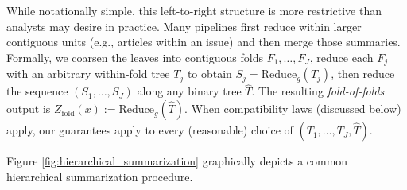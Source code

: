 \documentclass[11pt]{article}
\newcommand{\reduce}{\text{Reduce}}
\newcommand{\reduceg}{\reduce_g}
\begin{document}
While notationally simple, this left-to-right structure is more restrictive than analysts may desire in practice. Many pipelines first reduce within larger contiguous units (e.g., articles within an issue) and then merge those summaries. Formally, we coarsen the leaves into contiguous folds $F_1,\ldots,F_J$, reduce each $F_j$ with an arbitrary within-fold tree $T_j$ to obtain $S_j=\reduceg(T_j)$, then reduce the sequence $(S_1,\ldots,S_J)$ along any binary tree $\widehat T$. The resulting \emph{fold-of-folds} output is $Z_{\mathrm{fold}}(x):=\reduceg(\widehat T)$. When compatibility laws (discussed below) apply, our guarantees apply to every (reasonable) choice of $(T_1,\ldots,T_J,\widehat T)$.

Figure \ref{fig:hierarchical_summarization} graphically depicts a common hierarchical summarization procedure. 
\end{document}
